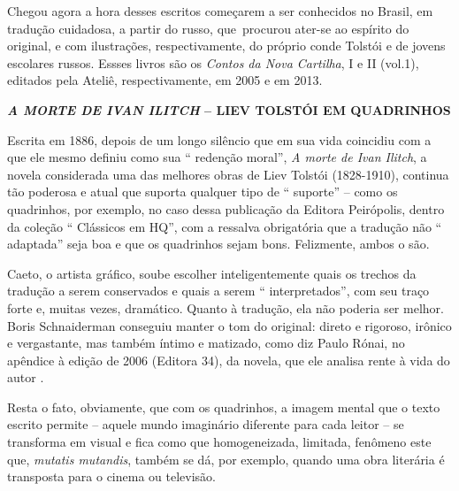 Chegou agora a hora desses escritos começarem a ser conhecidos no
Brasil, em tradução cuidadosa, a partir do russo, que~procurou ater-se
ao espírito do original, e com ilustrações, respectivamente, do próprio
conde Tolstói e de jovens escolares russos. Essses livros são os
\emph{Contos da Nova Cartilha}, I e II (vol.1), editados pela Ateliê,
respectivamente, em 2005 e em 2013.

\textbf{\emph{A MORTE DE IVAN ILITCH} -- LIEV TOLSTÓI EM QUADRINHOS}

Escrita em 1886, depois de um longo silêncio que em sua vida coincidiu
com a que ele mesmo definiu como sua `` redenção moral'', \emph{A morte
de Ivan Ilitch}, a novela considerada uma das melhores obras de Liev
Tolstói (1828-1910), continua tão poderosa e atual que suporta qualquer
tipo de `` suporte'' -- como os quadrinhos, por exemplo, no caso dessa
publicação da Editora Peirópolis, dentro da coleção `` Clássicos em
HQ'', com a ressalva obrigatória que a tradução não `` adaptada'' seja
boa e que os quadrinhos sejam bons. Felizmente, ambos o são.

Caeto, o artista gráfico, soube escolher inteligentemente quais os
trechos da tradução a serem conservados e quais a serem ``
interpretados'', com seu traço forte e, muitas vezes, dramático. Quanto
à tradução, ela não poderia ser melhor. Boris Schnaiderman conseguiu
manter o tom do original: direto e rigoroso, irônico e vergastante, mas
também íntimo e matizado, como diz Paulo Rónai, no apêndice à edição de
2006 (Editora 34), da novela, que ele analisa rente à vida do autor .

Resta o fato, obviamente, que com os quadrinhos, a imagem mental que o
texto escrito permite -- aquele mundo imaginário diferente para cada
leitor -- se transforma em visual e fica como que homogeneizada,
limitada, fenômeno este que, \emph{mutatis mutandis}, também se dá, por
exemplo, quando uma obra literária é transposta para o cinema ou
televisão.

